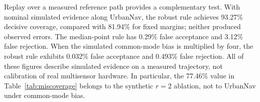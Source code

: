 Replay over a measured reference path provides a complementary test. With nominal simulated evidence along UrbanNav, the robust rule achieves 93.27\% decisive coverage, compared with 81.94\% for fixed margins; neither produced observed errors. The median-point rule has 0.29\% false acceptance and 3.12\% false rejection. When the simulated common-mode bias is multiplied by four, the robust rule exhibits 0.032\% false acceptance and 0.493\% false rejection. All of these figures describe simulated evidence on a measured trajectory, not calibration of real multisensor hardware. In particular, the 77.46\% value in Table~\ref{tab:miscoverage} belongs to the synthetic $r=2$ ablation, not to UrbanNav under common-mode bias.
